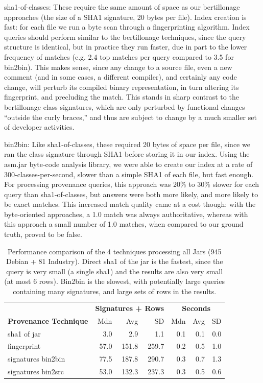 sha1-of-classes:  These require the same amount of space as our bertillonage approaches (the size
of a SHA1 signature, 20 bytes per file).  Index creation is fast:  for each
file we run a byte scan through a fingerprinting algorithm.
Index queries should perform similar to the bertillonage techniques, since
the query structure is identical, but in practice they run faster, due in part
to the lower frequency of matches (e.g. 2.4 top matches per query compared to
3.5 for bin2bin).  This makes sense, since any change to a source file,
even a new comment (and in some cases, a different compiler),
and certainly any code change, will perturb its
compiled binary representation, in turn altering its fingerprint, and precluding
the match.
This stands in sharp contrast to the bertillonage class signatures, which are only perturbed by functional
changes ``outside the curly braces,'' and thus are subject to change by a much smaller set of 
developer activities.

bin2bin: Like sha1-of-classes, these required 20 bytes
of space per file, since we ran the class signature through SHA1 before storing
it in our index.
Using the asm.jar byte-code analysis library, we were able to create our index at a
rate of 300-classes-per-second, slower than a simple SHA1 of each file, but fast enough.
For processing provenance queries, this approach was 20\% to 30\% slower for each query than
sha1-of-classes, but answers were both more likely, and more likely to be exact matches.
This increased match quality came at a cost though:  with the byte-oriented approaches,
a 1.0 match was always authoritative, whereas with this approach a small number of 1.0 matches, when
compared to our ground truth, proved to be false.



\begin{table}[h]
  \centering
\begin{tabular}[htbp]{l|rrr|rrr}
                                    & \multicolumn{3}{c|}{\textbf{Signatures + Rows}}  & \multicolumn{3}{c}{\textbf{Seconds}} \\
  \textbf{Provenance Technique}     & Mdn   & Avg    & SD    & Mdn  & Avg  & SD  \\
  \hline
  sha1 of jar                       &  3.0  &   2.9  &   1.1 & 0.1  & 0.1  & 0.0   \\
  fingerprint                       & 57.0  & 151.8  & 259.7 & 0.2  & 0.5  & 1.0  \\
  signatures bin2bin                & 77.5  & 187.8  & 290.7 & 0.3  & 0.7  & 1.3   \\
  signatures bin2src                & 53.0  & 132.3  & 237.3 & 0.3  & 0.5  & 0.6   \\
  \hline
\end{tabular}
  \caption{Performance comparison of the 4 techniques processing all Jars (945 Debian + 81 Industry).  Direct sha1 of the jar is the fastest, since
the query is very small (a single sha1) and the results are also very small (at most 6 rows).   Bin2bin is the slowest,
with potentially large queries containing many signatures, and large sets of rows in the results.}
  \label{tab:perfSummary}
\end{table}



